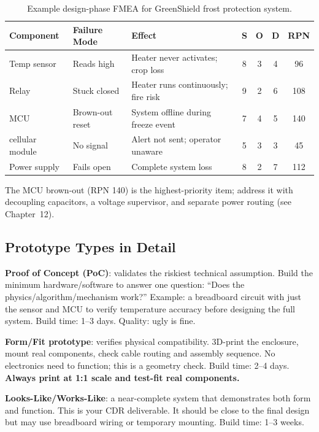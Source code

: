 \begin{table}[htbp]\centering\small
\begin{tabularx}{\textwidth}{l l X c c c c}
\toprule
\textbf{Component} & \textbf{Failure Mode} & \textbf{Effect} & \textbf{S} & \textbf{O} & \textbf{D} & \textbf{RPN} \\
\midrule
Temp sensor & Reads high & Heater never activates; crop loss & 8 & 3 & 4 & 96 \\
Relay & Stuck closed & Heater runs continuously; fire risk & 9 & 2 & 6 & 108 \\
MCU & Brown-out reset & System offline during freeze event & 7 & 4 & 5 & 140 \\
cellular module & No signal & Alert not sent; operator unaware & 5 & 3 & 3 & 45 \\
Power supply & Fails open & Complete system loss & 8 & 2 & 7 & 112 \\
\bottomrule
\end{tabularx}
\caption{Example design-phase FMEA for GreenShield frost protection system.}
\end{table}

The MCU brown-out (RPN 140) is the highest-priority item; address it with decoupling capacitors, a voltage supervisor, and separate power routing (see Chapter~12).


\subsection{Prototype Types in Detail}
\textbf{Proof of Concept (PoC)}: validates the riskiest technical assumption. Build the minimum hardware/software to answer one question: ``Does the physics/algorithm/mechanism work?'' Example: a breadboard circuit with just the sensor and MCU to verify temperature accuracy before designing the full system. Build time: 1--3 days. Quality: ugly is fine.

\textbf{Form/Fit prototype}: verifies physical compatibility. 3D-print the enclosure, mount real components, check cable routing and assembly sequence. No electronics need to function; this is a geometry check. Build time: 2--4 days. \textbf{Always print at 1:1 scale and test-fit real components.}

\textbf{Looks-Like/Works-Like}: a near-complete system that demonstrates both form and function. This is your CDR deliverable. It should be close to the final design but may use breadboard wiring or temporary mounting. Build time: 1--3 weeks.

